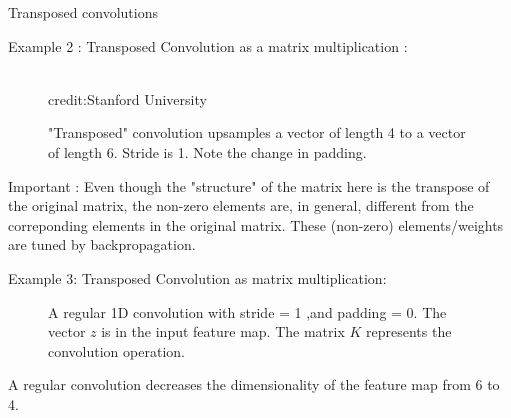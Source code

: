 \begin{vbframe}{Transposed convolutions}
  
\framebreak
Example 2 : Transposed Convolution as a matrix multiplication :
\begin{figure}
\centering
{}
\tiny{\\credit:Stanford University}
\caption{"Transposed" convolution upsamples a vector of length 4 to a vector of length 6. Stride is 1. Note the change in padding.}
\end{figure}
\small{Important : Even though the "structure" of the matrix here is the transpose of the original matrix, the non-zero elements are, in general, different from the correponding elements in the original matrix. These (non-zero) elements/weights are tuned by backpropagation.} 

\framebreak 

Example 3: Transposed Convolution as matrix multiplication:
\begin{figure}
\centering
{}
\caption{A regular 1D convolution with  stride = 1 ,and padding = 0. The vector $z$ is in the input feature map. The matrix $K$ represents the convolution operation.}
\end{figure}
  A regular convolution decreases the dimensionality of the feature map from 6 to 4.\\
\end{vbframe}


